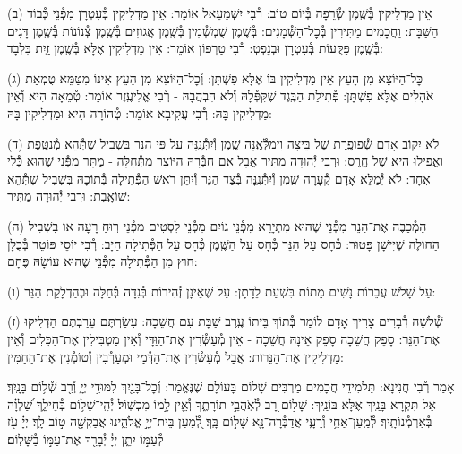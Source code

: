 \documentclass[twoside, openany, parskip=half, 11pt]{book}
\begin{document}
(ב) אֵין מַדְלִיקִין בְּ֯שֶֽׁמֶן שְׂ֯רֵפָה בְּ֯יוֹם טוֹב: רְ֯בִי יִשְׁמָעֵאל אוֹמֵר: אֵין מַדְלִיקִין בְּ֯עִטְרָן מִפְּ֯נֵי כְּ֯בוֹד הַשַּׁבָּת: וַחֲכָמִים מַתִּירִין בְּ֯כׇל־הַשְּׁ֯מָנִים: בְּ֯שֶֽׁמֶן שֻׁמְשְׁ֯מִין בְּ֯שֶֽׁמֶן אֱגוֹזִים בְּ֯שֶֽׁמֶן צְ֯נוֹנוֹת בְּ֯שֶֽׁמֶן דָּגִים בְּ֯שֶֽׁמֶן פַּקֻּעוֹת בְּ֯עִטְרָן וּבְנֵפְטְ: רְ֯בִי טַרְפוֹן אוֹמֵר: אֵין מַדְלִיקִין אֶלָּא בְּ֯שֶֽׁמֶן זַֽיִת בִּלְבָד:

(ג) כׇּל־הַיּוֹצֵא מִן הָעֵץ אֵין מַדְלִיקִין בּוֹ אֶלָּא פִשְׁתָּן: וְ֯כׇל־הַיּוֹצֵא מִן הָעֵץ אֵינוֹ מִטַּמֵּא טֻמְאַת אֹהָלִים אֶלָּא פִשְׁתָּן: פְּ֯תִילַת הַבֶּֽגֶד שֶׁקִּפְּ֯לָהּ וְ֯לֹא הִבְהֲבָהּ - רְ֯בִי אֱלִיעֶֽזֶר אוֹמֵר: טְ֯מֵאָה הִיא וְ֯אֵין מַדְלִיקִין בָּהּ: רְ֯בִי עֲקִיבָא אוֹמֵר: טְ֯הוֹרָה הִיא וּמַדְלִיקִין בָּהּ:

(ד) לֹא יִקּוֹב אָדָם שְׁ֯פוֹפֶֽרֶת שֶׁל בֵּיצָה וִימַלְּ֯אֶֽנָּה שֶֽׁמֶן וְ֯יִתְּ֯נֶֽנָּה עַל פִּי הַנֵּר בִּשְׁבִיל שֶׁתְּ֯הֵא מְ֯נַטֶּֽפֶת וַאֲפִילוּ הִיא שֶׁל חֶֽרֶס: וּרְבִי יְ֯הוּדָה מַתִּיר אֲבָל אִם חִבְּ֯רָהּ הַיּוֹצֵר מִתְּ֯חִלָּה - מֻתָּר מִפְּ֯נֵי שֶׁהוּא כְּ֯לִי אֶחָד: לֹא יְ֯מַלֵּא אָדָם קְ֯עָרָה שֶֽׁמֶן וְ֯יִתְּ֯נֶֽנָּה בְּ֯צַד הַנֵּר וְ֯יִתֵּן רֹאשׁ הַפְּ֯תִילָה בְּ֯תוֹכָהּ בִּשְׁבִיל שֶׁתְּ֯הֵא שׁוֹאָֽבֶת: וּרְבִי יְ֯הוּדָה מַתִּיר:

(ה) הַמְ֯כַבֶּה אֶת־הַנֵּר מִפְּ֯נֵי שֶׁהוּא מִתְיָרֵא מִפְּ֯נֵי גוֹיִם מִפְּ֯נֵי לִסְטִים מִפְּ֯נֵי רֽוּחַ רָעָה אוֹ בִּשְׁבִיל הַחוֹלֶה שֶׁיִּישָׁן פָּטוּר: כְּ֯חָס עַל הַנֵּר כְּ֯חָס עַל הַשֶּֽׁמֶן כְּ֯חָס עַל הַפְּ֯תִילָה חַיָּב: רְ֯בִי יוֹסֵי פּוֹטֵר בְּ֯כֻלָּן חוּץ מִן הַפְּ֯תִילָה מִפְּ֯נֵי שֶׁהוּא עוֹשָׂהּ פֶּחָם:

(ו) עַל שָׁלֹשׁ עֲבֵרוֹת נָשִׁים מֵתוֹת בִּשְׁעַת לֵדָתָן: עַל שֶׁאֵינָן זְ֯הִירוֹת בְּ֯נִדָּה בְּ֯חַלָּה וּבְהַדְלָקַת הַנֵּר:

(ז) שְׁ֯לֹשָׁה דְ֯בָרִים צָרִיךְ אָדָם לוֹמַר בְּ֯תוֹךְ בֵּיתוֹ עֶֽרֶב שַׁבָּת עִם חֲשֵׁכָה: עִשַׂרְתֶּם עֵרַבְתֶּם הַדְלִֽיקוּ אֶת־הַנֵּר: סָפֵק חֲשֵׁכָה סָפֵק אֵינָהּ חֲשֵׁכָה - אֵין מְ֯עַשְּׂ֯רִין אֶת־הַוַּדָּי וְ֯אֵין מַטְבִּילִין אֶת־הַכֵּלִים וְ֯אֵין מַדְלִיקִין אֶת־הַנֵּרוֹת: אֲבָל מְ֯עַשְּׂ֯רִין אֶת־הַדְּ֯מָי וּמְעָרְ֯בִין וְ֯טוֹמְ֯נִין אֶת־הַחַמִּין:


 
אָמַר רְ֯בִי חֲנִינָא: תַּלְמִידֵי חֲכָמִים מַרְבִּים שָׁלוֹם בָּעוֹלָם שֶׁנֶּאֱמַר:
וְ֯כׇל־בָּנַ֖יִךְ לִמּוּדֵ֣י יְיָ֑ וְ֯רַ֖ב שְׁ֯ל֥וֹם בָּנָֽיִךְ׃ אַל תִּקְרָא בָּנַֽיִךְ אֶלָּא בּוֹנַֽיִךְ: שָׁל֣וֹם רָ֭ב לְ֯אֹֽהֲבֵ֣י תוֹרָתֶ֑ךָ וְ֯אֵ֖ין לָ֣מוֹ מִכְשֽׁוֹל׃ יְ֯הִֽי־שָׁל֥וֹם בְּ֯חֵילֵ֑ךְ שַׁ֝לְוָ֗ה בְּ֯אַרְמְ֯נוֹתָֽיִךְ׃  לְ֯מַֽעַן־אַחַ֥י וְ֯רֵעָ֑י אֲדַבְּ֯רָה־נָּ֖א שָׁל֣וֹם בָּֽךְ׃ לְ֭֯מַעַן בֵּית־יְיָ֣ אֱלֹהֵ֑ינוּ אֲבַקְשָׁ֖ה ט֣וֹב לָֽךְ׃
יְיָ֗ עֹ֖ז לְ֯עַמּ֣וֹ יִתֵּ֑ן יְיָ֓ יְ֯בָרֵ֖ךְ אֶת־עַמּ֣וֹ בַ֯שָּׁלֽוֹם׃
\end{document}
